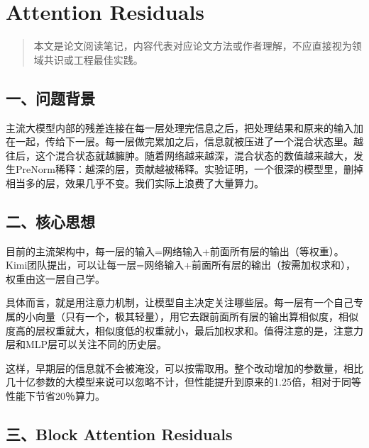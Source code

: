 \setcounter{section}{3}

\hypertarget{attention-residuals}{%
\section{Attention Residuals}\label{attention-residuals}}

\begin{quote}
本文是论文阅读笔记，内容代表对应论文方法或作者理解，不应直接视为领域共识或工程最佳实践。
\end{quote}

\hypertarget{ux4e00ux95eeux9898ux80ccux666f}{%
\subsection{一、问题背景}\label{ux4e00ux95eeux9898ux80ccux666f}}

主流大模型内部的残差连接在每一层处理完信息之后，把处理结果和原来的输入加在一起，传给下一层。每一层做完累加之后，信息就被压进了一个混合状态里。越往后，这个混合状态就越臃肿。随着网络越来越深，混合状态的数值越来越大，发生PreNorm稀释：越深的层，贡献越被稀释。实验证明，一个很深的模型里，删掉相当多的层，效果几乎不变。我们实际上浪费了大量算力。

\hypertarget{ux4e8cux6838ux5fc3ux601dux60f3-1}{%
\subsection{二、核心思想}\label{ux4e8cux6838ux5fc3ux601dux60f3-1}}

目前的主流架构中，每一层的输入=网络输入+前面所有层的输出（等权重）。Kimi团队提出，可以让每一层=网络输入+前面所有层的输出（按需加权求和），权重由这一层自己学。

具体而言，就是用注意力机制，让模型自主决定关注哪些层。每一层有一个自己专属的小向量（只有一个，极其轻量），用它去跟前面所有层的输出算相似度，相似度高的层权重就大，相似度低的权重就小，最后加权求和。值得注意的是，注意力层和MLP层可以关注不同的历史层。

这样，早期层的信息就不会被淹没，可以按需取用。整个改动增加的参数量，相比几十亿参数的大模型来说可以忽略不计，但性能提升到原来的1.25倍，相对于同等性能下节省20％算力。

\hypertarget{ux4e09block-attention-residuals}{%
\subsection{三、Block Attention Residuals}\label{ux4e09block-attention-residuals}}

